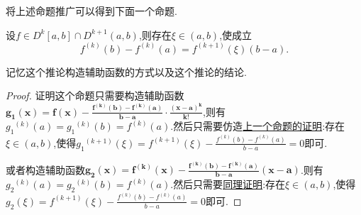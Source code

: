 \documentclass[lang=cn,newtx,10pt,scheme=chinese]{../Template/elegantbook}
\begin{document}
\begin{remark}
    将上述命题推广可以得到下面一个命题.
\end{remark}
\begin{corollary}\label{cor:Lagrange中值定理的推广(k+1阶导数)}
    设\(f\in D^{k}[a,b]\cap D^{k+1}\left( a,b \right) \),则存在\(\xi\in(a,b)\),使成立
    \[
    f^{(k)}(b) - f^{(k)}(a) = f^{(k+1)}(\xi)(b - a).
    \]
\end{corollary}
\begin{note}
    记忆这个推论构造辅助函数的方式以及这个推论的结论.
\end{note}
\begin{proof}
    证明这个命题只需要构造辅助函数$\boldsymbol{g}_{\boldsymbol{1}}\left( \boldsymbol{x} \right) =\boldsymbol{f}\left( \boldsymbol{x} \right) -\frac{\boldsymbol{f}^{\left( \boldsymbol{k} \right)}\left( \boldsymbol{b} \right) -\boldsymbol{f}^{\left( \boldsymbol{k} \right)}\left( \boldsymbol{a} \right)}{\boldsymbol{b}-\boldsymbol{a}}\cdot \frac{\left( \boldsymbol{x}-\boldsymbol{a} \right) ^{\boldsymbol{k}}}{\boldsymbol{k}!}$,则有${g_1}^{\left( k \right)}\left( a \right) ={g_1}^{\left( k \right)}\left( b \right) =f^{\left( k \right)}\left( a \right) .$然后只需要仿造\hyperref[proof:Lagrange中值定理的推广(二阶导数)-证明]{上一个命题的证明}:存在$\xi \in (a,b)$,使得${g_1}^{\left( k+1 \right)}\left( \xi \right) =f^{\left( k+1 \right)}\left( \xi \right) -\frac{f^{\left( k \right)}\left( b \right) -f^{\left( k \right)}\left( a \right)}{b-a}=0$即可.

或者构造辅助函数$\boldsymbol{g}_{\boldsymbol{2}}\left( \boldsymbol{x} \right) =\boldsymbol{f}^{\left( \boldsymbol{k} \right)}\left( \boldsymbol{x} \right) -\frac{\boldsymbol{f}^{\left( \boldsymbol{k} \right)}\left( \boldsymbol{b} \right) -\boldsymbol{f}^{\left( \boldsymbol{k} \right)}\left( \boldsymbol{a} \right)}{\boldsymbol{b}-\boldsymbol{a}}\left( \boldsymbol{x}-\boldsymbol{a} \right)$.则有${g_2}^{\left( k \right)}\left( a \right) ={g_2}^{\left( k \right)}\left( b \right) =f^{\left( k \right)}\left( a \right) .$然后只需要\hyperref[proof:Lagrange中值定理的推广(二阶导数)-证明]{同理证明}:存在$\xi \in (a,b)$,使得$g_2\left( \xi \right) =f^{\left( k+1 \right)}\left( \xi \right) -\frac{f^{\left( k \right)}\left( b \right) -f^{\left( k \right)}\left( a \right)}{b-a}=0$即可.
\end{proof}
\end{document}
